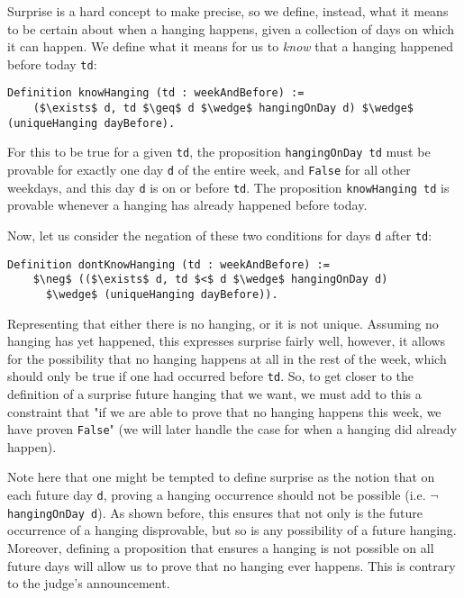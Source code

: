 \documentclass[runningheads]{llncs}
\begin{document}
Surprise is a hard concept to make precise, so we define, instead, what it means to be certain about
when a hanging happens, given a collection of days on which it can happen.
We define what it means for us to \emph{know} that a hanging happened before today {\tt td}:

\begin{lstlisting}[mathescape=true]
  Definition knowHanging (td : weekAndBefore) :=
    ($\exists$ d, td $\geq$ d $\wedge$ hangingOnDay d) $\wedge$ (uniqueHanging dayBefore).
\end{lstlisting}

For this to be true for a given {\tt td}, the proposition
{\tt hangingOnDay td} must be provable
for exactly one day {\tt d} of the entire week, and {\tt False} for all other
 weekdays, and this day {\tt d} is
on or before {\tt td}.
The proposition {\tt knowHanging td} is provable whenever a hanging has already
happened before today.

Now, let us consider the negation of these two conditions for days {\tt d} after {\tt td}:

\begin{lstlisting}[mathescape=true]
  Definition dontKnowHanging (td : weekAndBefore) :=
    $\neg$ (($\exists$ d, td $<$ d $\wedge$ hangingOnDay d)
      $\wedge$ (uniqueHanging dayBefore)).
\end{lstlisting}

Representing that either there is no hanging, or it is not unique. Assuming no
hanging has yet happened, this expresses surprise fairly
well, however, it allows for the possibility that no hanging happens at all in the
rest of the week, which should only be true if one had occurred before {\tt td}.
So, to get closer to the definition of a surprise future hanging that we want,
we must add to this a constraint that "if we are able to prove that no
hanging happens this week, we have proven {\tt False}" (we will later handle the case for when
a hanging did already happen).

Note here that one might be tempted to define surprise as the notion that on each future day {\tt d}, proving a hanging
occurrence should not be possible (i.e. {\tt $\neg$ hangingOnDay d}).
As shown before, this ensures that not only is the future occurrence of a hanging
disprovable, but so is any possibility of a future hanging.
Moreover, defining a proposition that ensures a hanging is not possible on all
future days will allow us to prove that no hanging ever happens.
This is contrary to the judge's announcement.
\end{document}
